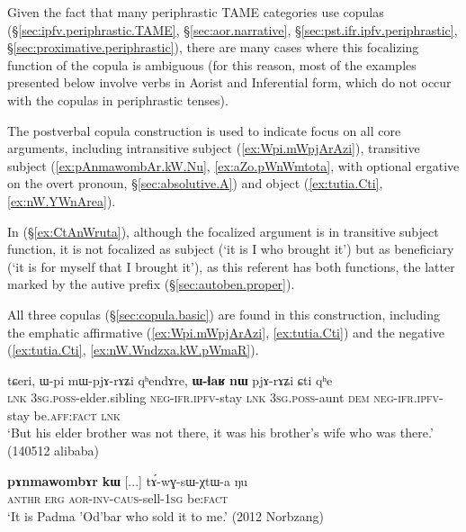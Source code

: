Given the fact that many periphrastic TAME categories use copulas (§\ref{sec:ipfv.periphrastic.TAME}, §\ref{sec:aor.narrative}, §\ref{sec:pst.ifr.ipfv.periphrastic}, §\ref{sec:proximative.periphrastic}), there are many cases where this focalizing function of the copula is ambiguous (for this reason, most of the examples presented below involve verbs in Aorist and Inferential form, which do not occur with the copulas in periphrastic tenses). 


The postverbal copula construction is used to indicate focus on all core arguments, including intransitive subject (\ref{ex:Wpi.mWpjArAzi}), transitive subject (\ref{ex:pAnmawombAr.kW.Nu}, \ref{ex:aZo.pWnWmtota}, with optional ergative on the overt pronoun, §\ref{sec:absolutive.A}) and object (\ref{ex:tutia.Cti}, \ref{ex:nW.YWnArea}).
 
In (§\ref{ex:CtAnWruta}), although the focalized argument is in transitive subject function, it is not focalized as subject (`it is I who brought it') but as beneficiary (`it is for myself that I brought it'), as this referent has both functions, the latter marked by the autive prefix  (§\ref{sec:autoben.proper}).

All three copulas (§\ref{sec:copula.basic}) are found in this construction, including the emphatic affirmative  (\ref{ex:Wpi.mWpjArAzi}, \ref{ex:tutia.Cti}) and the negative  (\ref{ex:tutia.Cti}, \ref{ex:nW.Wndzxa.kW.pWmaR}).

\begin{exe}
\ex \label{ex:Wpi.mWpjArAzi}
\gll tɕeri, ɯ-pi mɯ-pjɤ-rɤʑi qʰendɤre,  \textbf{ɯ-ɬaʁ} \textbf{nɯ} pjɤ-rɤʑi ɕti qʰe  \\
\textsc{lnk} \textsc{3sg}.\textsc{poss}-elder.sibling \textsc{neg}-\textsc{ifr}.\textsc{ipfv}-stay \textsc{lnk} \textsc{3sg}.\textsc{poss}-aunt \textsc{dem} \textsc{neg}-\textsc{ifr}.\textsc{ipfv}-stay be.\textsc{aff}:\textsc{fact} \textsc{lnk} \\
\glt  `But his elder brother was not there, it was his brother's wife who was there.' (140512 alibaba)
\end{exe}

\begin{exe}
\ex \label{ex:pAnmawombAr.kW.Nu}
\gll  \textbf{pɤnmawombɤr} \textbf{kɯ} [...] tɤ́-wɣ-sɯ-χtɯ-a ŋu \\
\textsc{anthr} \textsc{erg} { } \textsc{aor}-\textsc{inv}-\textsc{caus}-sell-\textsc{1sg} be:\textsc{fact} \\
\glt `It is Padma 'Od'bar who sold it to me.' (2012 Norbzang)
\end{exe} 

